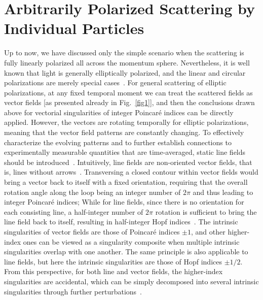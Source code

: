 \documentclass[aps,twocolumn,superscriptaddress]{revtex4-1}
\newcounter{Fig}
\begin{document}
\section{Arbitrarily Polarized Scattering by Individual Particles}

Up to now, we have discussed only the simple scenario when the scattering is fully linearly polarized all across the momentum sphere. Nevertheless, it is well known that light is generally elliptically polarized, and the linear and circular polarizations are merely special cases~\cite{jackson1962classical}.  For general scattering of elliptic polarizations, at any fixed temporal moment we can treat the scattered fields as vector fields [as presented already in Fig.~\ref{fig1}], and then the conclusions drawn above for vectorial singularities of integer Poincar\'{e} indices can be directly applied.  However, the vectors are rotating temporally for elliptic polarizations, meaning that the vector field patterns are constantly changing. To effectively characterize the evolving patterns and to further establish connections to experimentally measurable quantities that are time-averaged, static line fields should be introduced~\cite{CHEN_2019_ArXiv190409910Math-PhPhysicsphysics_Linea,HOPF_2003__Differential,NYE_natural_1999,GBUR_2016__Singular}. Intuitively, line fields are non-oriented vector fields, that is, lines without arrows~\cite{HOPF_2003__Differential,NYE_natural_1999,GBUR_2016__Singular}. Transversing a closed contour within vector fields would bring a vector back to itself with a fixed orientation, requiring that the overall rotation angle along the loop being an integer number of $2\pi$ and thus leading to integer Poincar\'{e} indices; While for line fields, since there is no orientation for each consisting line, a half-integer number of $2\pi$ rotation is sufficient to bring the line field back to itself, resulting in half-integer Hopf indices~\cite{HOPF_2003__Differential}.  The intrinsic singularities of vector fields are those of Poincar\'{e} indices $\pm1$, and other higher-index ones can be viewed as a singularity composite when multiple intrinsic singularities overlap with one another. The same principle is also applicable to line fields, but here the intrinsic singularities are those of Hopf indices $\pm1/2$. From this perspective, for both line and vector fields, the higher-index singularities are accidental, which can be simply decomposed into several intrinsic singularities through further perturbations~\cite{MILNOR_1997__Topology,NEEDHAM_1998__Visual,HOPF_2003__Differential}.
\end{document}
